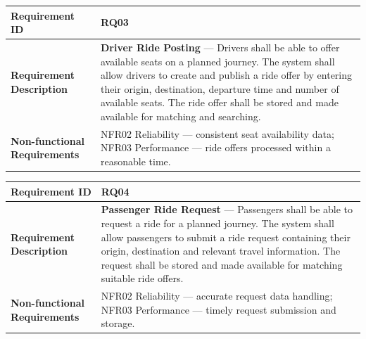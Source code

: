 \begin{minipage}{\textwidth}
\small
\begin{tabular}{|>{\raggedright\arraybackslash}p{}|>{\raggedright\arraybackslash}p{}|}
\hline
\textbf{Requirement ID} & RQ03 \\
\hline
\textbf{Requirement Description} & \textbf{Driver Ride Posting} --- Drivers shall be able to offer available seats on a planned journey. The system shall allow drivers to create and publish a ride offer by entering their origin, destination, departure time and number of available seats. The ride offer shall be stored and made available for matching and searching. \\
\hline
\textbf{Non-functional Requirements} & NFR02 Reliability --- consistent seat availability data; \newline NFR03 Performance --- ride offers processed within a reasonable time. \\
\hline
\end{tabular}
\end{minipage}
\medskip
 
\begin{minipage}{\textwidth}
\small
\begin{tabular}{|>{\raggedright\arraybackslash}p{}|>{\raggedright\arraybackslash}p{}|}
\hline
\textbf{Requirement ID} & RQ04 \\
\hline
\textbf{Requirement Description} & \textbf{Passenger Ride Request} --- Passengers shall be able to request a ride for a planned journey. The system shall allow passengers to submit a ride request containing their origin, destination and relevant travel information. The request shall be stored and made available for matching suitable ride offers. \\
\hline
\textbf{Non-functional Requirements} & NFR02 Reliability --- accurate request data handling; \newline NFR03 Performance --- timely request submission and storage. \\
\hline
\end{tabular}
\end{minipage}
\medskip
 
